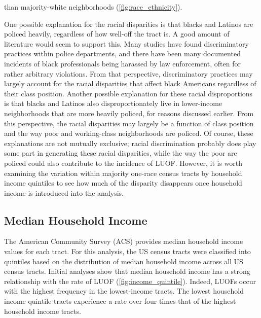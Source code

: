 \documentclass[12pt]{article}
\begin{document}
\noindent{}than majority-white neighborhoods (\autoref{fig:race_ethnicity}).

One possible explanation for the racial disparities is that blacks and Latinos are policed heavily, regardless of how well-off the tract is. A good amount of literature would seem to support this. Many studies have found discriminatory practices within police departments, and there have been many documented incidents of black professionals being harassed by law enforcement, often for rather arbitrary violations. From that perspective, discriminatory practices may largely account for the racial disparities that affect black Americans regardless of their class position. Another possible explanation for these racial disproportions is that blacks and Latinos also disproportionately live in lower-income neighborhoods that are more heavily policed, for reasons discussed earlier. From this perspective, the racial disparities may largely be a function of class position and the way poor and working-class neighborhoods are policed. Of course, these explanations are not mutually exclusive; racial discrimination probably does play some part in generating these racial disparities, while the way the poor are policed could also contribute to the incidence of LUOF. However, it is worth examining the variation within majority one-race census tracts by household income quintiles to see how much of the disparity disappears once household income is introduced into the analysis.

\subsection{Median Household Income}

The American Community Survey (ACS) provides median household income values for each tract. For this analysis, the US census tracts were classified into quintiles based on the distribution of median household income across all US census tracts. Initial analyses show that median household income has a strong relationship with the rate of LUOF (\autoref{fig:income_quintile}). Indeed, LUOFs occur with the highest frequency in the lowest-income tracts. The lowest household income quintile tracts experience a rate over four times that of the highest household income tracts.
\end{document}
